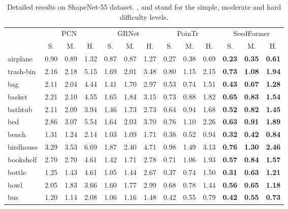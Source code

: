 \begin{table*}[t]
	\centering
\scriptsize
	\setlength{\tabcolsep}{4.5pt}
\caption{Detailed results on ShapeNet-55 dataset. ,  and  stand for the simple, moderate and hard difficulty levels.}
	\vspace{5pt}
	\begin{tabular}{l|ccc|ccc|ccc|ccc}
		\toprule[1pt]
		 & \multicolumn{3}{c|}{PCN~\cite{yuan2018pcn}} & \multicolumn{3}{c|}{GRNet~\cite{xie2020grnet}} & \multicolumn{3}{c|}{PoinTr~\cite{yu2021pointr}} & \multicolumn{3}{c}{SeedFormer} \\
				& S. & M. & H. & S. & M. & H. & S. & M. & H. & S. & M. & H.\\
		\midrule[0.3pt]
		airplane 	   & 0.90 & 0.89 & 1.32 & 0.87 & 0.87 & 1.27 & 0.27 & 0.38 & 0.69 & \textbf{0.23} & \textbf{0.35} & \textbf{0.61} \\
		trash-bin 	   & 2.16 & 2.18 & 5.15 & 1.69 & 2.01 & 3.48 & 0.80 & 1.15 & 2.15 & \textbf{0.73} & \textbf{1.08} & \textbf{1.94} \\
		bag 		   & 2.11 & 2.04 & 4.44 & 1.41 & 1.70 & 2.97 & 0.53 & 0.74 & 1.51 & \textbf{0.43} & \textbf{0.67} & \textbf{1.28} \\
		basket 		   & 2.21 & 2.10 & 4.55 & 1.65 & 1.84 & 3.15 & 0.73 & 0.88 & 1.82 & \textbf{0.65} & \textbf{0.83} & \textbf{1.54} \\
		bathtub 	   & 2.11 & 2.09 & 3.94 & 1.46 & 1.73 & 2.73 & 0.64 & 0.94 & 1.68 & \textbf{0.52} & \textbf{0.82} & \textbf{1.45} \\
		bed 		   & 2.86 & 3.07 & 5.54 & 1.64 & 2.03 & 3.70 & 0.76 & 1.10 & 2.26 & \textbf{0.63} & \textbf{0.91} & \textbf{1.89} \\
		bench 		   & 1.31 & 1.24 & 2.14 & 1.03 & 1.09 & 1.71 & 0.38 & 0.52 & 0.94 & \textbf{0.32} & \textbf{0.42} & \textbf{0.84} \\
		birdhouse 	   & 3.29 & 3.53 & 6.69 & 1.87 & 2.40 & 4.71 & 0.98 & 1.49 & 3.13 & \textbf{0.76} & \textbf{1.30} & \textbf{2.46} \\
		bookshelf 	   & 2.70 & 2.70 & 4.61 & 1.42 & 1.71 & 2.78 & 0.71 & 1.06 & 1.93 & \textbf{0.57} & \textbf{0.84} & \textbf{1.57} \\
		bottle 		   & 1.25 & 1.43 & 4.61 & 1.05 & 1.44 & 2.67 & 0.37 & 0.74 & 1.50 & \textbf{0.31} & \textbf{0.63} & \textbf{1.21} \\
		bowl 		   & 2.05 & 1.83 & 3.66 & 1.60 & 1.77 & 2.99 & 0.68 & 0.78 & 1.44 & \textbf{0.56} & \textbf{0.65} & \textbf{1.18} \\
		bus 		   & 1.20 & 1.14 & 2.08 & 1.06 & 1.16 & 1.48 & 0.42 & 0.55 & 0.79 & \textbf{0.42} & \textbf{0.55} & \textbf{0.73} \\

\end{tabular}
\end{table*}
